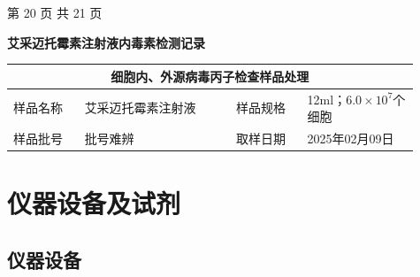 \documentclass[UTF8,10pt,a4paper,fontset=fandol]{ctexart}
\newcommand{\fieldvalue}[1]{#1}
\newcommand{\handwritten}[1]{#1}
\begin{document}
\begin{center}
第 20 页 共 21 页
\end{center}

\newpage

\begin{center}
\textbf{艾采迈托霉素注射液内毒素检测记录}
\end{center}

\begin{tabular}{|p{0.16\linewidth}|p{0.34\linewidth}|p{0.16\linewidth}|p{0.25\linewidth}|}
\hline
\multicolumn{4}{c}{细胞内、外源病毒丙子检查样品处理} \\
\hline
样品名称 &
\fieldvalue{艾采迈托霉素注射液} &
样品规格 &
\fieldvalue{12ml；$6.0\times 10^{7}$个细胞} \\
\hline
样品批号 &
\fieldvalue{\handwritten{批号难辨}} &
取样日期 &
\fieldvalue{\handwritten{2025年02月09日}} \\
\hline
\end{tabular}

\section{仪器设备及试剂}

\subsection{仪器设备}
\end{document}
